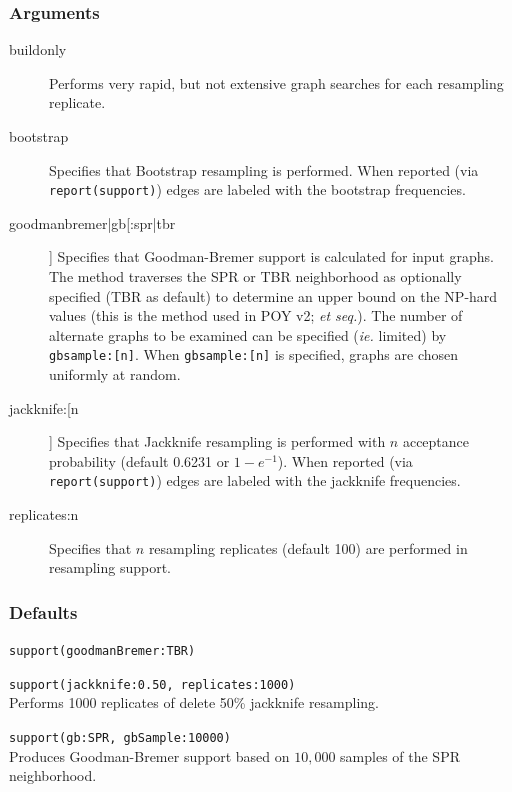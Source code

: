 	\subsubsection{Arguments}
		\begin{description}
			\item[buildonly] Performs very rapid, but not extensive graph searches for each 
			resampling replicate.
		
			\item[bootstrap] Specifies that Bootstrap resampling is performed. When reported 
			(via \texttt{report(support)}) edges are labeled with the bootstrap frequencies.
		
			\item[goodmanbremer|gb[:spr|tbr]] Specifies that Goodman-Bremer support is 
			calculated for input graphs. The method traverses the SPR or TBR neighborhood 
			as optionally specified (TBR as default) to determine an upper bound on the NP-hard 
			values (this is the method used in POY v2; \citealp{POY2} \textit{et seq.}). The number 
			of alternate graphs to be examined can be specified (\textit{ie.} limited) by \texttt{gbsample:[n]}. 
			When \texttt{gbsample:[n]} is specified, graphs are chosen uniformly at random.
		
			\item[jackknife:[n]] Specifies that Jackknife resampling is performed with $n$ acceptance 
			probability (default 0.6231 or $1 - e^{-1}$). When reported (via \texttt{report(support)}) 
			edges are labeled with the jackknife frequencies.
		
			\item[replicates:n] Specifies that $n$ resampling replicates (default 100) are performed 
			in resampling support.
		\end{description}	
		\subsubsection{Defaults}
			\texttt{support(goodmanBremer:TBR)}
		

		\begin{example}
			\item{\texttt{support(jackknife:0.50, replicates:1000)}\\Performs 1000 replicates of 
			delete 50\% jackknife resampling.}
				
			\item{\texttt{support(gb:SPR, gbSample:10000)}\\Produces Goodman-Bremer 
			support based on $10,000$ samples of 
						the SPR neighborhood.}
		\end{example}

